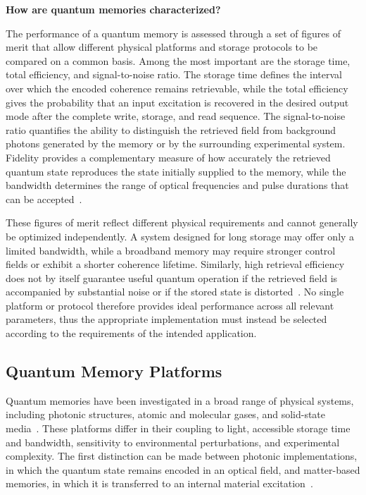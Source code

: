 \noindent\textbf{How are quantum memories characterized?}

The performance of a quantum memory is assessed through a set of figures of merit that allow different physical platforms and storage protocols to be compared on a common basis. Among the most important are the storage time, total efficiency, and signal-to-noise ratio. The storage time defines the interval over which the encoded coherence remains retrievable, while the total efficiency gives the probability that an input excitation is recovered in the desired output mode after the complete write, storage, and read sequence. The signal-to-noise ratio quantifies the ability to distinguish the retrieved field from background photons generated by the memory or by the surrounding experimental system. Fidelity provides a complementary measure of how accurately the retrieved quantum state reproduces the state initially supplied to the memory, while the bandwidth determines the range of optical frequencies and pulse durations that can be accepted~\cite{AWAVQMitCoSR_Rodriguez_,Qmeaara_HeshamiEtAl_2016,Oqm_LvovskyEtAl_2009}.

These figures of merit reflect different physical requirements and cannot generally be optimized independently. A system designed for long storage may offer only a limited bandwidth, while a broadband memory may require stronger control fields or exhibit a shorter coherence lifetime. Similarly, high retrieval efficiency does not by itself guarantee useful quantum operation if the retrieved field is accompanied by substantial noise or if the stored state is distorted~\cite{AWAVQMitCoSR_Rodriguez_,Qmeaara_HeshamiEtAl_2016}. No single platform or protocol therefore provides ideal performance across all relevant parameters, thus the appropriate implementation must instead be selected according to the requirements of the intended application.

\subsection{Quantum Memory Platforms}
\label{subsec:quantum_memory_platforms}

Quantum memories have been investigated in a broad range of physical systems, including photonic structures, atomic and molecular gases, and solid-state media~\cite{Qmeaara_HeshamiEtAl_2016,Oqm_LvovskyEtAl_2009}. These platforms differ in their coupling to light, accessible storage time and bandwidth, sensitivity to environmental perturbations, and experimental complexity. The first distinction can be made between photonic implementations, in which the quantum state remains encoded in an optical field, and matter-based memories, in which it is transferred to an internal material excitation~\cite{Qmeaara_HeshamiEtAl_2016,Oqm_LvovskyEtAl_2009}.


